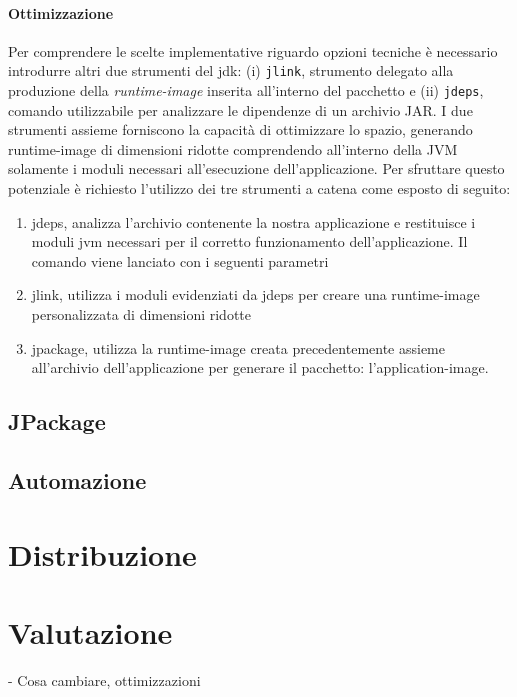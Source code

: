 \paragraph{Ottimizzazione} Per comprendere le scelte implementative riguardo opzioni tecniche è necessario introdurre altri due strumenti del \ac{jdk}: (i) \texttt{jlink}, strumento delegato alla produzione della \textit{runtime-image} inserita all'interno del pacchetto e (ii) \texttt{jdeps}, comando utilizzabile per analizzare le dipendenze di un archivio JAR. I due strumenti assieme forniscono la capacità di ottimizzare lo spazio, generando runtime-image di dimensioni ridotte comprendendo all'interno della JVM solamente i moduli necessari all'esecuzione dell'applicazione. Per sfruttare questo potenziale è richiesto l'utilizzo dei tre strumenti a catena come esposto di seguito:
\begin{enumerate}
	\item jdeps, analizza l'archivio contenente la nostra applicazione e restituisce i moduli jvm necessari per il corretto funzionamento dell'applicazione. Il comando viene lanciato con i seguenti parametri
	\item jlink, utilizza i moduli evidenziati da jdeps per creare una runtime-image personalizzata di dimensioni ridotte
	\item jpackage, utilizza la runtime-image creata precedentemente assieme all'archivio dell'applicazione per generare il pacchetto: l'application-image.
\end{enumerate}

\subsection{JPackage}

\subsection{Automazione}

\section{Distribuzione}

\section{Valutazione}

- Cosa cambiare, ottimizzazioni